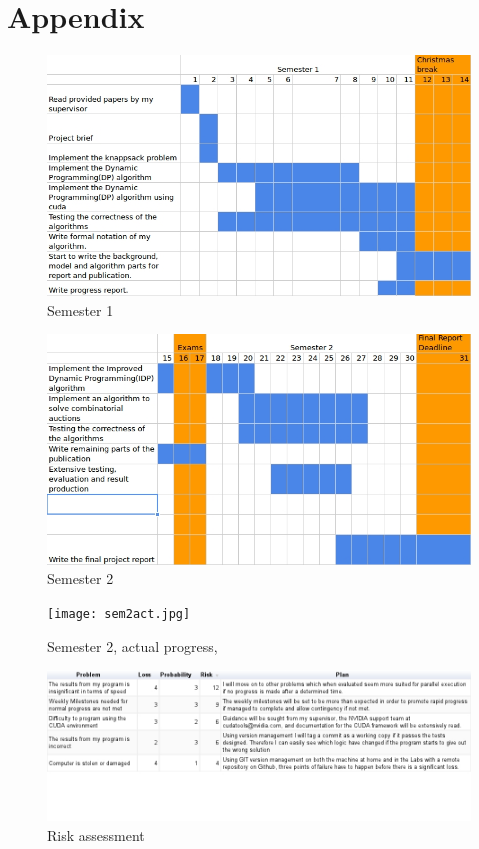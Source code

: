 \documentclass[a4paper, 12pt]{report}
\begin{document}


\section{Appendix}
\begin{figure}[htp]
\centering
\includegraphics[width=\linewidth]{sem1.jpg}
\caption{Semester 1}
\end{figure}
\begin{figure}[htp]
\centering
\includegraphics[width=\linewidth]{sem2.jpg}
\caption{Semester 2}
\end{figure}
\begin{figure}[htp]
\centering
\texttt{[image: sem2act.jpg]}
\caption{Semester 2, actual progress,\label{actual}}
\end{figure}
\begin{figure}[htp]
\centering
\includegraphics[width=\linewidth]{risk.jpg}
\caption{Risk assessment}
\end{figure}
\end{document}
